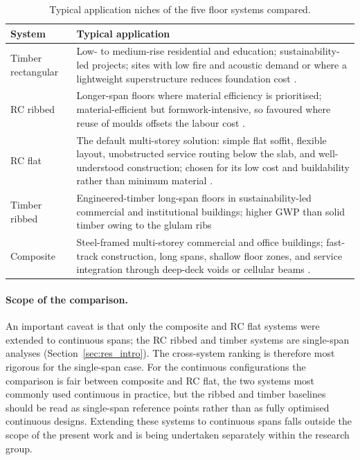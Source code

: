 \begin{table}[h!]
\centering
\caption{Typical application niches of the five floor systems compared.}
\label{tab:slab_applications}
\small
\begin{tabular}{p{} p{}}
\hline
System & Typical application \\
\hline
Timber rectangular & Low- to medium-rise residential and education; sustainability-led projects; sites with low fire and acoustic demand or where a lightweight superstructure reduces foundation cost \citep{CLT2023}. \\
RC ribbed & Longer-span floors where material efficiency is prioritised; material-efficient but formwork-intensive, so favoured where reuse of moulds offsets the labour cost \citep{RefWorks:kaufmann2024white}. \\
RC flat & The default multi-storey solution: simple flat soffit, flexible layout, unobstructed service routing below the slab, and well-understood construction; chosen for its low cost and buildability rather than minimum material \citep{RefWorks:kaufmann2024white,RefWorks:ammann2024correlations}. \\
Timber ribbed & Engineered-timber long-span floors in sustainability-led commercial and institutional buildings; higher GWP than solid timber owing to the glulam ribs \citep{CLT2023} \\
Composite & Steel-framed multi-storey commercial and office buildings; fast-track construction, long spans, shallow floor zones, and service integration through deep-deck voids or cellular beams \citep{RefWorks:2011composite,RefWorks:ahmed2019evolution,RefWorks:lawson1999slimflor,RefWorks:scip300}. \\
\hline
\end{tabular}
\end{table}

\paragraph{Scope of the comparison.} An important caveat is that only the composite and RC flat systems were extended to continuous spans; the RC ribbed and timber systems are single-span analyses (Section~\ref{sec:res_intro}). The cross-system ranking is therefore most rigorous for the single-span case. For the continuous configurations the comparison is fair between composite and RC flat, the two systems most commonly used continuous in practice, but the ribbed and timber baselines should be read as single-span reference points rather than as fully optimised continuous designs. Extending these systems to continuous spans falls outside the scope of the present work and is being undertaken separately within the research group.

